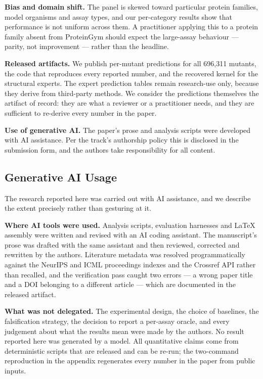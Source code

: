 \documentclass{article}
\begin{document}
\textbf{Bias and domain shift.} The panel is skewed toward particular protein families, model organisms and
assay types, and our per-category results show that performance is not uniform across them. A
practitioner applying this to a protein family absent from ProteinGym should expect the large-assay
behaviour --- parity, not improvement --- rather than the headline.

\textbf{Released artifacts.} We publish per-mutant predictions for all 696,311 mutants, the code that
reproduces every reported number, and the recovered kernel for the structural experts. The expert
prediction tables remain research-use only, because they derive from third-party methods. We consider
the predictions themselves the artifact of record: they are what a reviewer or a practitioner needs,
and they are sufficient to re-derive every number in the paper.

\textbf{Use of generative AI.} The paper's prose and analysis scripts were developed with AI assistance.
Per the track's authorship policy this is disclosed in the submission form, and the authors take
responsibility for all content.

\subsection{Generative AI Usage}\label{generative-ai-usage}

The research reported here was carried out with AI assistance, and we describe the extent precisely
rather than gesturing at it.

\textbf{Where AI tools were used.} Analysis scripts, evaluation harnesses and LaTeX assembly were written and
revised with an AI coding assistant. The manuscript's prose was drafted with the same assistant and
then reviewed, corrected and rewritten by the authors. Literature metadata was resolved programmatically
against the NeurIPS and ICML proceedings indexes and the Crossref API rather than recalled, and the
verification pass caught two errors --- a wrong paper title and a DOI belonging to a different article ---
which are documented in the released artifact.

\textbf{What was not delegated.} The experimental design, the choice of baselines, the falsification
strategy, the decision to report a per-assay oracle, and every judgement about what the results mean
were made by the authors. No result reported here was generated by a model. All quantitative claims
come from deterministic scripts that are released and can be re-run; the two-command reproduction in the
appendix regenerates every number in the paper from public inputs.
\end{document}
